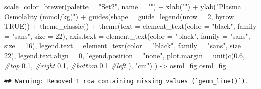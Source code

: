\documentclass[
]{article}
\newenvironment{Shaded}{\begin{snugshade}}{\end{snugshade}}
\newcommand{\AttributeTok}[1]{\textcolor[rgb]{0.77,0.63,0.00}{#1}}
\newcommand{\CommentTok}[1]{\textcolor[rgb]{0.56,0.35,0.01}{\textit{#1}}}
\newcommand{\ConstantTok}[1]{\textcolor[rgb]{0.00,0.00,0.00}{#1}}
\newcommand{\DecValTok}[1]{\textcolor[rgb]{0.00,0.00,0.81}{#1}}
\newcommand{\FloatTok}[1]{\textcolor[rgb]{0.00,0.00,0.81}{#1}}
\newcommand{\FunctionTok}[1]{\textcolor[rgb]{0.00,0.00,0.00}{#1}}
\newcommand{\NormalTok}[1]{#1}
\newcommand{\OtherTok}[1]{\textcolor[rgb]{0.56,0.35,0.01}{#1}}
\newcommand{\SpecialCharTok}[1]{\textcolor[rgb]{0.00,0.00,0.00}{#1}}
\newcommand{\StringTok}[1]{\textcolor[rgb]{0.31,0.60,0.02}{#1}}
\begin{document}
\begin{Shaded}
\begin{Highlighting}[]
  \FunctionTok{scale\_color\_brewer}\NormalTok{(}\AttributeTok{palette =} \StringTok{"Set2"}\NormalTok{, }\AttributeTok{name =} \StringTok{""}\NormalTok{) }\SpecialCharTok{+}
  \FunctionTok{xlab}\NormalTok{(}\StringTok{""}\NormalTok{) }\SpecialCharTok{+} 
  \FunctionTok{ylab}\NormalTok{(}\StringTok{"Plasma Osmolality (mmol/kg)"}\NormalTok{) }\SpecialCharTok{+} 
  \FunctionTok{guides}\NormalTok{(}\AttributeTok{shape =} \FunctionTok{guide\_legend}\NormalTok{(}\AttributeTok{nrow =} \DecValTok{2}\NormalTok{, }\AttributeTok{byrow =} \ConstantTok{TRUE}\NormalTok{)) }\SpecialCharTok{+}
  \FunctionTok{theme\_classic}\NormalTok{() }\SpecialCharTok{+}
  \FunctionTok{theme}\NormalTok{(}\AttributeTok{text =} \FunctionTok{element\_text}\NormalTok{(}\AttributeTok{color =} \StringTok{"black"}\NormalTok{, }
                            \AttributeTok{family =} \StringTok{"sans"}\NormalTok{, }
                            \AttributeTok{size =} \DecValTok{22}\NormalTok{),}
        \AttributeTok{axis.text =} \FunctionTok{element\_text}\NormalTok{(}\AttributeTok{color =} \StringTok{"black"}\NormalTok{, }
                                 \AttributeTok{family =} \StringTok{"sans"}\NormalTok{, }
                                 \AttributeTok{size =} \DecValTok{16}\NormalTok{),}
        \AttributeTok{legend.text =} \FunctionTok{element\_text}\NormalTok{(}\AttributeTok{color =} \StringTok{"black"}\NormalTok{, }
                                 \AttributeTok{family =} \StringTok{"sans"}\NormalTok{, }
                                 \AttributeTok{size =} \DecValTok{22}\NormalTok{),}
        \AttributeTok{legend.text.align =} \DecValTok{0}\NormalTok{,}
        \AttributeTok{legend.position =} \StringTok{"none"}\NormalTok{,}
        \AttributeTok{plot.margin =} \FunctionTok{unit}\NormalTok{(}\FunctionTok{c}\NormalTok{(}\FloatTok{0.6}\NormalTok{, }\CommentTok{\#top}
                             \FloatTok{0.1}\NormalTok{, }\CommentTok{\#right}
                             \FloatTok{0.1}\NormalTok{, }\CommentTok{\#bottom}
                             \FloatTok{0.1} \CommentTok{\#left}
\NormalTok{                             ), }\StringTok{"cm"}\NormalTok{)}
\NormalTok{        ) }\OtherTok{{-}\textgreater{}}\NormalTok{ osml\_fig}
\NormalTok{osml\_fig}
\end{Highlighting}
\end{Shaded}

\begin{verbatim}
## Warning: Removed 1 row containing missing values (`geom_line()`).
\end{verbatim}
\end{document}
